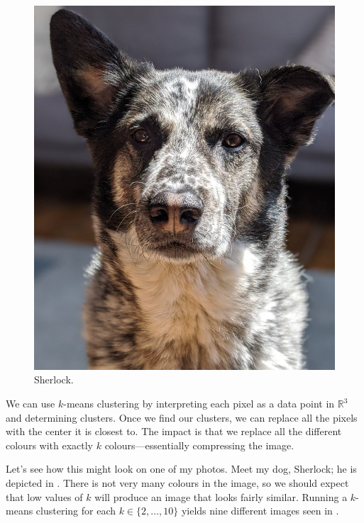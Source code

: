 \documentclass[a4paper, 12pt]{article}
\numberwithin{equation}{section}
\numberwithin{figure}{section}
\theoremstyle{definition}
\newcommand{\R}{\mathbb{R}}
\begin{document}
\begin{figure}
	\centering
	\includegraphics[scale=0.20]{graphics/Sherlock.jpg}
	\caption{Sherlock.}
	\label{fig:sherlock}
\end{figure}
We can use $k$-means clustering by interpreting each pixel as a data point in
$\R^3$ and determining clusters. Once we find our clusters, we can replace all
the pixels with the center it is closest to. The impact is that we replace all
the different colours with exactly $k$ colours---essentially compressing the
image. 

Let's see how this might look on one of my photos. Meet my dog, Sherlock; he is
depicted in . There is not very many colours in the image, so
we should expect that low values of $k$ will produce an image that looks fairly
similar. Running a $k$-means clustering for each $k\in \{2,\dots, 10\}$ yields
nine different images seen in .
\end{document}
